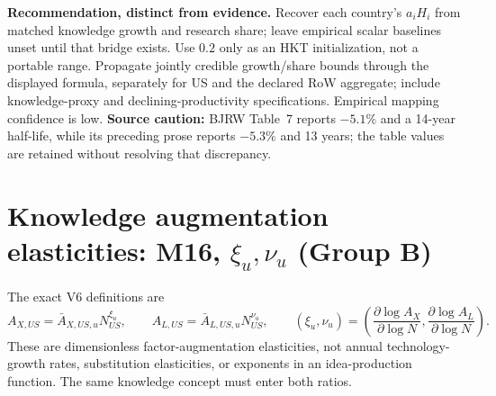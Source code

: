 \noindent\textbf{Recommendation, distinct from evidence.}
Recover each country's $a_iH_i$ from matched knowledge growth and research
share; leave empirical scalar baselines unset until that bridge exists.
Use $0.2$ only as an HKT initialization, not a portable range.
Propagate jointly credible growth/share bounds through the displayed
formula, separately for US and the declared RoW aggregate; include
knowledge-proxy and declining-productivity specifications. Empirical mapping
confidence is low. \textbf{Source caution:} BJRW Table~7 reports $-5.1\%$
and a 14-year half-life, while its preceding prose reports $-5.3\%$ and
13 years; the table values are retained without resolving that discrepancy.

\clearpage
\section{Knowledge augmentation elasticities: M16, $\xi_u,\nu_u$ (Group B)}

The exact V6 definitions are
\[
 A_{X,US}=\bar A_{X,US,u}N_{US}^{\xi_u},\qquad
 A_{L,US}=\bar A_{L,US,u}N_{US}^{\nu_u},\qquad
 (\xi_u,\nu_u)=
 \left(\frac{\partial\log A_X}{\partial\log N},
       \frac{\partial\log A_L}{\partial\log N}\right).
\]
These are dimensionless factor-augmentation elasticities, not annual
technology-growth rates, substitution elasticities, or exponents in an
idea-production function. The same knowledge concept must enter both ratios.

